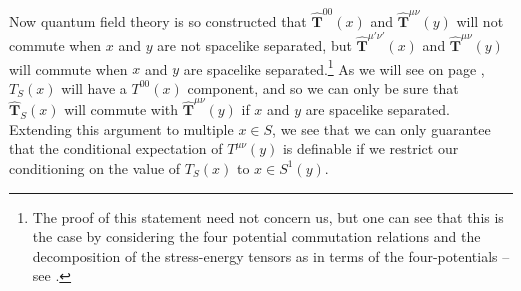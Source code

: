 Now quantum field theory is so constructed that $\hat{\bm{T}}^{{00}}(x)$ and $\hat{\bm{T}}^{{\mu\nu}}(y)$ will not commute when $x$ and $y$ are not spacelike separated, but $\hat{\bm{T}}^{{\mu'\nu'}}(x)$ and $\hat{\bm{T}}^{{\mu\nu}}(y)$ will commute when $x$ and $y$ are spacelike separated.\footnote{The proof of this statement need not concern us, but one can see that this is the case by considering the four potential commutation relations and the decomposition of the stress-energy tensors as in terms of the four-potentials  -- see \cite[p.1443--1444]{SchwingerJulianI}.} As we will see on page \pageref{TSdef}, $T_S(x)$ will have a $T^{00}(x)$ component, and so we can only be sure that $\hat{\bm{T}}_S(x)$ will commute with  $\hat{\bm{T}}^{{\mu\nu}}(y)$ if $x$ and $y$ are spacelike separated. Extending this argument to multiple $x\in S$, we see that we can only guarantee that the conditional expectation of $T^{\mu\nu}(y)$ is definable if we restrict our conditioning on the value of $T_S(x)$ to $x\in S^1(y)$.



 
 
